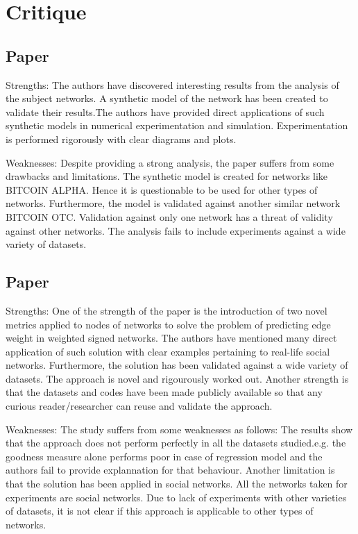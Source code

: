 

\section{Critique} \label{sec:critique}

\subsection{Paper \cite{aw2018analyzing}} 

Strengths: The authors have discovered interesting results from the analysis of the subject networks. A synthetic model of the network has been created to validate their results.The authors have provided direct applications of such synthetic models in numerical experimentation and simulation. Experimentation is performed rigorously with clear diagrams and plots.
	
Weaknesses: Despite providing a strong analysis, the paper suffers from some drawbacks and limitations. The synthetic model is created for networks like BITCOIN ALPHA. Hence it is questionable to be used for other types of networks. Furthermore, the model is validated against another similar network BITCOIN OTC. Validation against only one network has a threat of validity against other networks. The analysis fails to include experiments against a wide variety of datasets.
\subsection{Paper \cite{kumar2016edge}}
Strengths: One of the strength of the paper is the introduction of two novel metrics applied to nodes of networks to solve the problem of predicting edge weight in weighted signed networks. The authors have mentioned many direct application of such solution with clear examples pertaining to real-life social networks. Furthermore, the solution has been validated against a wide variety of datasets. The approach is novel and rigourously worked out. Another strength is that the datasets and codes have been made publicly available so that any curious reader/researcher can reuse and validate the approach. 

Weaknesses: The study suffers from some weaknesses as follows: The results show that the approach does not perform perfectly in all the datasets studied.e.g. the goodness measure alone performs poor in case of regression model and the authors fail to provide explannation for that behaviour. Another limitation is that the solution has been applied in social networks. All the networks taken for experiments are social networks. Due to lack of experiments with other varieties of datasets, it is not clear if this approach is applicable to other types of networks.
